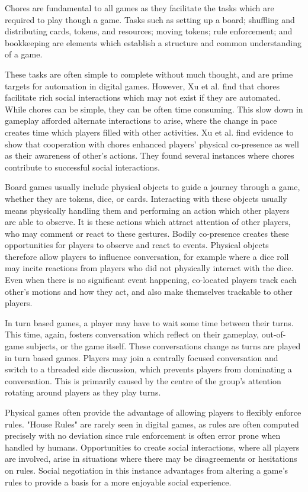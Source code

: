 \documentclass[12pt]{article}
\begin{document}
Chores are fundamental to all games as they facilitate the tasks which are required to play though a game.
Tasks such as setting up a board; shuffling and distributing cards, tokens, and resources; moving tokens; rule enforcement; and bookkeeping are elements which establish a structure and common understanding of a game. 

These tasks are often simple to complete without much thought, and are prime targets for automation in digital games. 
However, Xu et al. find that chores facilitate rich social interactions which may not exist if they are automated. 
While chores can be simple, they can be often time consuming. 
This slow down in gameplay afforded alternate interactions to arise, where the change in pace creates time which players filled with other activities. 
Xu et al. find evidence to show that cooperation with chores enhanced players' physical co-presence as well as their awareness of other's actions. 
They found several instances where chores contribute to successful social interactions. 

Board games usually include physical objects to guide a journey through a game, whether they are tokens, dice, or cards. 
Interacting with these objects usually means physically handling them and performing an action which other players are able to observe.
It is these actions which attract attention of other players, who may comment or react to these gestures. 
Bodily co-presence creates these opportunities for players to observe and react to events. 
Physical objects therefore allow players to influence conversation, for example where a dice roll may incite reactions from players who did not physically interact with the dice. 
Even when there is no significant event happening, co-located players track each other's motions and how they act, and also make themselves trackable to other players. 

In turn based games, a player may have to wait some time between their turns. 
This time, again, fosters conversation which reflect on their gameplay, out-of-game subjects, or the game itself. 
These conversations change as turns are played in turn based games. 
Players may join a centrally focused conversation and switch to a threaded side discussion, which prevents players from dominating a conversation. 
This is primarily caused by the centre of the group's attention rotating around players as they play turns. 

Physical games often provide the advantage of allowing players to flexibly enforce rules. 
"House Rules" are rarely seen in digital games, as rules are often computed precisely with no deviation since rule enforcement is often error prone when handled by humans. 
Opportunities to create social interactions, where all players are involved, arise in situations where there may be disagreements or hesitations on rules. 
Social negotiation in this instance advantages from altering a game's rules to provide a basis for a more enjoyable social experience.
\end{document}
